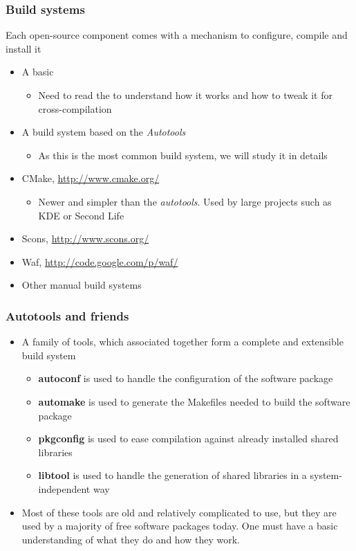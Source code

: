 \begin{frame}
  \frametitle{Build systems}
  Each open-source component comes with a mechanism to
  configure, compile and install it
  \begin{itemize}
  \item A basic 
    \begin{itemize}
    \item Need to read the  to understand how it
      works and how to tweak it for cross-compilation
    \end{itemize}
  \item A build system based on the {\em Autotools}
    \begin{itemize}
    \item As this is the most common build system, we will study it
      in details
    \end{itemize}
  \item CMake, \url{http://www.cmake.org/}
    \begin{itemize}
    \item Newer and simpler than the {\em autotools}. Used by large
      projects such as KDE or Second Life
    \end{itemize}
  \item Scons, \url{http://www.scons.org/}
  \item Waf, \url{http://code.google.com/p/waf/}
  \item Other manual build systems
  \end{itemize}
\end{frame}

\begin{frame}
  \frametitle{Autotools and friends}
  \begin{itemize}
  \item A family of tools, which associated together form a complete
    and extensible build system
    \begin{itemize}
    \item {\bf autoconf} is used to handle the configuration of the
      software package
    \item {\bf automake} is used to generate the Makefiles needed to
      build the software package
    \item {\bf pkgconfig} is used to ease compilation against already
      installed shared libraries
    \item {\bf libtool} is used to handle the generation of shared
      libraries in a system-independent way
    \end{itemize}
  \item Most of these tools are old and relatively complicated to use,
    but they are used by a majority of free software packages
    today. One must have a basic understanding of what they do and how
    they work.
  \end{itemize}
\end{frame}

